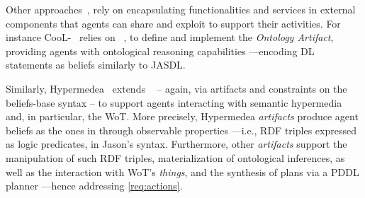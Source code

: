 \documentclass[
]{ceurart}
\begin{document}
%
Other approaches~\cite{DBLP:journals/wias/MascardiABBR14,DBLP:conf/www/CharpenayZLB22, DBLP:conf/semweb/ONeillBBC21, DBLP:conf/emas/CiorteaBR18}, rely on encapsulating functionalities and services in external components that agents can share and exploit to support their activities.
%
For instance
CooL-\agentspeak{}~\cite{DBLP:journals/wias/MascardiABBR14} relies on \cartago{}~\cite{DBLP:books/sp/09/RicciPVO09},
to define and implement the \emph{Ontology Artifact},
providing agents with ontological reasoning capabilities%
---encoding \ac{DL} statements as beliefs similarly to JASDL.

Similarly, 
Hypermedea~\cite{DBLP:conf/www/CharpenayZLB22} extends \jacamo{}~\cite{BOISSIER2013747}
-- again, via artifacts and constraints on the beliefs-base syntax --
to support agents interacting with semantic hypermedia and, in particular, the \ac{WoT}.
%
More precisely,
Hypermedea \emph{artifacts} produce agent beliefs as the ones in 
through observable properties
---i.e., \ac{RDF} triples expressed as logic predicates,
in Jason's syntax.
%
Furthermore, 
other \emph{artifacts} support the manipulation of such \ac{RDF} triples,
materialization of ontological inferences,
as well as the interaction with \acs{WoT}'s \emph{things},
and the synthesis of plans via a PDDL planner
---hence addressing \ref{req:actions}.
%

\end{document}
